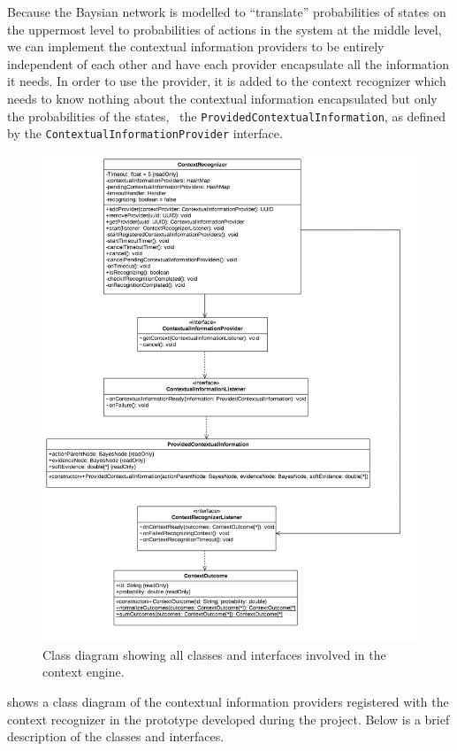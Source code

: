Because the Baysian network is modelled to ``translate'' probabilities of states on the uppermost level to probabilities of actions in the system at the middle level, we can implement the contextual information providers to be entirely independent of each other and have each provider encapsulate all the information it needs.
In order to use the provider, it is added to the context recognizer which needs to know nothing about the contextual information encapsulated but only the probabilities of the states, \ie~the \texttt{ProvidedContextualInformation}, as defined by the \texttt{ContextualInformationProvider} interface.

\begin{figure}[h!]
\centering
\includegraphics[width=\textwidth]{images/uml-context-engine}
\caption{Class diagram showing all classes and interfaces involved in the context engine.}
\label{fig:implementation:context-engine}
\end{figure}

 shows a class diagram of the contextual information providers registered with the context recognizer in the prototype developed during the project. Below is a brief description of the classes and interfaces.


